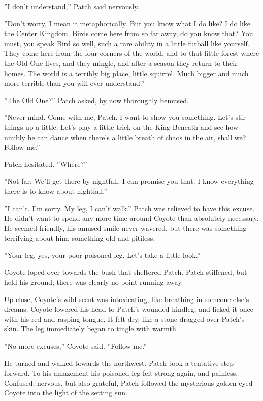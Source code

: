 \documentclass[11pt]{article}
\begin{document}
 ''I don't understand,'' Patch said nervously.\par
 ''Don't worry, I mean it metaphorically. But you know what I do like? I do like the Center Kingdom. Birds come here from so far away, do you know that? You must, you speak Bird so well, such a rare ability in a little furball like yourself. They come here from the four corners of the world, and to that little forest where the Old One lives, and they mingle, and after a season they return to their homes. The world is a terribly big place, little squirrel. Much bigger and much more terrible than you will ever understand.''\par
 ''The Old One?'' Patch asked, by now thoroughly bemused.\par
 ''Never mind. Come with me, Patch. I want to show you something. Let's stir things up a little. Let's play a little trick on the King Beneath and see how nimbly he can dance when there's a little breath of chaos in the air, shall we? Follow me.''\par
 Patch hesitated. ''Where?''\par
 ''Not far. We'll get there by nightfall. I can promise you that. I know everything there is to know about nightfall.''\par
 ''I can't. I'm sorry. My leg, I can't walk.'' Patch was relieved to have this excuse. He didn't want to spend any more time around Coyote than absolutely necessary. He seemed friendly, his amused smile never wavered, but there was something terrifying about him; something old and pitiless.\par
 ''Your leg, yes, your poor poisoned leg. Let's take a little look.''\par
 Coyote loped over towards the bush that sheltered Patch. Patch stiffened, but held his ground; there was clearly no point running away.\par
 Up close, Coyote's wild scent was intoxicating, like breathing in someone else's dreams. Coyote lowered his head to Patch's wounded hindleg, and licked it once with his red and rasping tongue. It felt dry, like a stone dragged over Patch's skin. The leg immediately began to tingle with warmth.\par
 ''No more excuses,'' Coyote said. ''Follow me.''\par
 He turned and walked towards the northwest. Patch took a tentative step forward. To his amazement his poisoned leg felt strong again, and painless. Confused, nervous, but also grateful, Patch followed the mysterious golden-eyed Coyote into the light of the setting sun.\par
\end{document}
